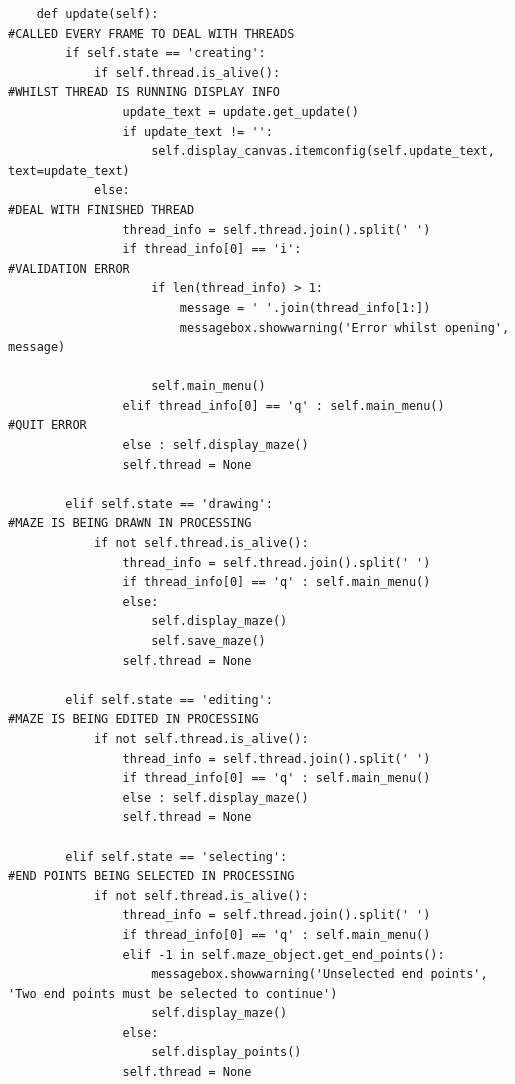 \documentclass[titlepage]{article}
\begin{document}
\begin{changemargin}{-1in}{-1in}
\begin{verbatim}
    def update(self):                                                           #CALLED EVERY FRAME TO DEAL WITH THREADS
        if self.state == 'creating':
            if self.thread.is_alive():                                          #WHILST THREAD IS RUNNING DISPLAY INFO
                update_text = update.get_update()
                if update_text != '':
                    self.display_canvas.itemconfig(self.update_text, text=update_text)
            else:                                                               #DEAL WITH FINISHED THREAD
                thread_info = self.thread.join().split(' ')
                if thread_info[0] == 'i':                                       #VALIDATION ERROR
                    if len(thread_info) > 1:
                        message = ' '.join(thread_info[1:])
                        messagebox.showwarning('Error whilst opening', message)

                    self.main_menu()
                elif thread_info[0] == 'q' : self.main_menu()                   #QUIT ERROR
                else : self.display_maze()
                self.thread = None            

        elif self.state == 'drawing':                                           #MAZE IS BEING DRAWN IN PROCESSING
            if not self.thread.is_alive():
                thread_info = self.thread.join().split(' ')
                if thread_info[0] == 'q' : self.main_menu()
                else:
                    self.display_maze()
                    self.save_maze()
                self.thread = None            

        elif self.state == 'editing':                                           #MAZE IS BEING EDITED IN PROCESSING
            if not self.thread.is_alive():
                thread_info = self.thread.join().split(' ')
                if thread_info[0] == 'q' : self.main_menu()
                else : self.display_maze()
                self.thread = None            

        elif self.state == 'selecting':                                         #END POINTS BEING SELECTED IN PROCESSING
            if not self.thread.is_alive():
                thread_info = self.thread.join().split(' ')
                if thread_info[0] == 'q' : self.main_menu()
                elif -1 in self.maze_object.get_end_points():
                    messagebox.showwarning('Unselected end points', 'Two end points must be selected to continue')
                    self.display_maze()
                else:
                    self.display_points()
                self.thread = None


\end{verbatim}
\end{changemargin}
\end{document}
